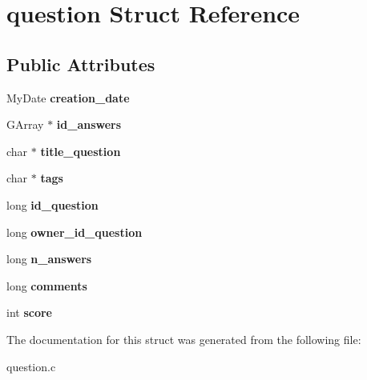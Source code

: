 \hypertarget{structquestion}{}\section{question Struct Reference}
\label{structquestion}
\subsection*{Public Attributes}
\begin{DoxyCompactItemize}
\item 
My\+Date {\bfseries creation\+\_\+date}\hypertarget{structquestion_ae9ce69074e02faf72814a1db1012e688}{}\label{structquestion_ae9ce69074e02faf72814a1db1012e688}

\item 
G\+Array $\ast$ {\bfseries id\+\_\+answers}\hypertarget{structquestion_aacecd8aa73f516bfbf8d32689580072d}{}\label{structquestion_aacecd8aa73f516bfbf8d32689580072d}

\item 
char $\ast$ {\bfseries title\+\_\+question}\hypertarget{structquestion_ade1ba3d4ffc0eb255a3c1c362502bc54}{}\label{structquestion_ade1ba3d4ffc0eb255a3c1c362502bc54}

\item 
char $\ast$ {\bfseries tags}\hypertarget{structquestion_a31b4187676364ac35e3da500e6e61f2b}{}\label{structquestion_a31b4187676364ac35e3da500e6e61f2b}

\item 
long {\bfseries id\+\_\+question}\hypertarget{structquestion_a0d040a0a2f277980ce8255d2ad182c23}{}\label{structquestion_a0d040a0a2f277980ce8255d2ad182c23}

\item 
long {\bfseries owner\+\_\+id\+\_\+question}\hypertarget{structquestion_afbc7d975ab72d7d8b423ed17d31a5e93}{}\label{structquestion_afbc7d975ab72d7d8b423ed17d31a5e93}

\item 
long {\bfseries n\+\_\+answers}\hypertarget{structquestion_ae49c17599f079267745d91c62ad7d5c6}{}\label{structquestion_ae49c17599f079267745d91c62ad7d5c6}

\item 
long {\bfseries comments}\hypertarget{structquestion_abaa980eb5da4d73e462dadc2009b9951}{}\label{structquestion_abaa980eb5da4d73e462dadc2009b9951}

\item 
int {\bfseries score}\hypertarget{structquestion_a7cd2dd5468f724bc953d63f89d43d96f}{}\label{structquestion_a7cd2dd5468f724bc953d63f89d43d96f}

\end{DoxyCompactItemize}


The documentation for this struct was generated from the following file\+:\begin{DoxyCompactItemize}
\item 
question.\+c\end{DoxyCompactItemize}
